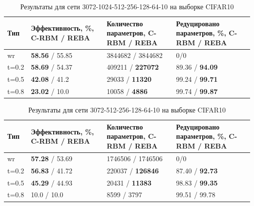\begin{table} [!h]
  \small
  \caption{Результаты для сети 3072-1024-512-256-128-64-10 на выборке CIFAR10}\label{table:cifar_10_1}
\centering
\begin{tabular}{| p{2cm} | p{4cm} | p{4cm} | p{4cm} |}
  \hline
    \textbf{Тип} & \textbf{Эффективность, \%, C-RBM / REBA} & \textbf{Количество параметров, C-RBM / REBA} & \textbf{Редуцировано параметров, \%, C-RBM / REBA}\\
    \hline
    wr & \textbf{58.56} / 55.85 & 3844682 / 3844682 & 0/0\\
    \hline
    t=0.2 & \textbf{58.69} / 54.37 & 409211 / \textbf{227072} & 89.36 / \textbf{94.09}\\
    \hline
    t=0.5 & \textbf{42.08} / 41.2 & 29033 / \textbf{11320} & 99.24 / \textbf{99.71}\\
    \hline
    t=0.8 & \textbf{23.02} / 10.0 & 10058 / \textbf{4886} & 99.74 / \textbf{99.87}\\
    \hline
\end{tabular}
\end{table}

\begin{table} [!h]
  \small
  \caption{Результаты для сети 3072-512-256-128-64-10 на выборке CIFAR10 }\label{table:cifar_10_2}
\centering
\begin{tabular}{| p{2cm} | p{4cm} | p{4cm} | p{4cm} |}
  \hline
    \textbf{Тип} & \textbf{Эффективность, \%, C-RBM / REBA} & \textbf{Количество параметров, C-RBM / REBA} & \textbf{Редуцировано параметров, \%, C-RBM / REBA}\\
    \hline
    wr & \textbf{57.28} / 53.69 & 1746506 / 1746506 & 0/0\\
    \hline
    t=0.2 & \textbf{56.83} / 41.72 & 220037 / \textbf{126846} & 87.40 / \textbf{92.73}\\
    \hline
    t=0.5 & \textbf{45.29} / 44.93 & 20431 / \textbf{11383} & 98.83 / \textbf{99.35}\\
    \hline
    t=0.8 & 10.0 / 10.0 & 8599 / 3797 & 99.51 / 99.78\\
    \hline
\end{tabular}
\end{table}

